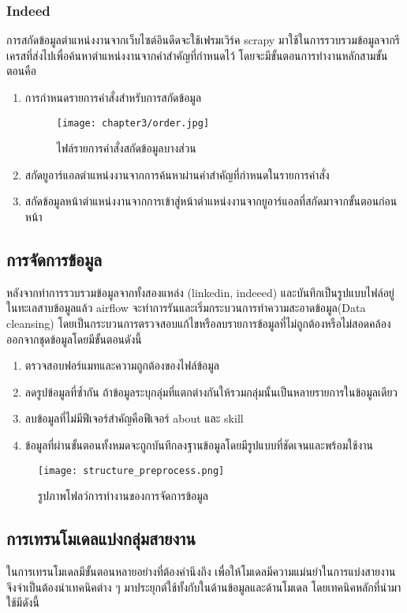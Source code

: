 \subsubsection{Indeed}
การสกัดข้อมูลตำแหน่งงานจากเว็บไซต์อินดีดจะใช้เฟรมเวิร์ค scrapy มาใช้ในการรวบรวมข้อมูลจากรีเครสที่ส่งไปเพื่อค้นหาตำแหน่งงานจากคำสำคัญที่กำหนดไว้ โดยจะมีขั้นตอนการทำงานหลักสามขั้นตอนคือ
\begin{enumerate}
  \item การกำหนดรายการคำสั่งสำหรับการสกัดข้อมูล
  \begin{figure}[!h]
    \centering
    \texttt{[image: chapter3/order.jpg]}  
    \caption{ไฟล์รายการคำสั่งสกัดข้อมูลบางส่วน}
    \label{Fig:scrap-order}
  \end{figure}
  \item สกัดยูอาร์แอลตำแหน่งงานจากการค้นหาผ่านคำสำคัญที่กำหนดในรายการคำสั่ง
  \item สกัดข้อมูลหน้าตำแหน่งงานจากการเข้าสู่หน้าตำแหน่งงานจากยูอาร์แอลที่สกัดมาจากขั้นตอนก่อนหน้า
\end{enumerate}


\subsection{การจัดการข้อมูล}
หลังจากทำการรวบรวมข้อมูลจากทั้งสองแหล่ง (linkedin, indeeed) และบันทึกเป็นรูปแบบไฟล์อยู่ในทะเลสาบข้อมูลแล้ว airflow จะทำการรันและเริ่มกระบวนการทำความสะอาดข้อมูล(Data cleansing) โดยเป็นกระบวนการตรวจสอบแก้ไขหรือลบรายการข้อมูลที่ไม่ถูกต้องหรือไม่สอดคล้องออกจากชุดข้อมูลโดยมีขั้นตอนดังนี้
\begin{enumerate}
  \item ตรวจสอบฟอร์แมทและความถูกต้องของไฟล์ข้อมูล
  \item ลดรูปข้อมูลที่ซ้ำกัน ถ้าข้อมูลระบุกลุ่มที่แตกต่างกันให้รวมกลุ่มนั้นเป็นหลายรายการในข้อมูลเดียว
  \item ลบข้อมูลที่ไม่มีฟีเจอร์สำคัญคือฟีเจอร์ about และ skill
  \item ข้อมูลที่ผ่านขั้นตอนทั้งหมดจะถูกบันทึกลงฐานข้อมูลโดยมีรูปแบบที่ชัดเจนและพร้อมใช้งาน
\end{enumerate}

\begin{figure}[!h]
  \centering
  \texttt{[image: structure\_preprocess.png]}  
  \caption{รูปภาพโฟลว์การทำงานของการจัดการข้อมูล}
  \label{Fig:data-collection}
\end{figure}



\subsection{การเทรนโมเดลแบ่งกลุ่มสายงาน}
  ในการเทรนโมเดลมีขั้นตอนหลายอย่างที่ต้องคำนึงถึง เพื่อให้โมเดลมีความแม่นยำในการแบ่งสายงาน จึงจำเป็นต้องนำเทคนิคต่าง ๆ มาประยุกต์ใช้ทั้งกับในด้านข้อมูลและด้านโมเดล โดยเทคนิคหลักที่นำมาใช้มีดังนี้
